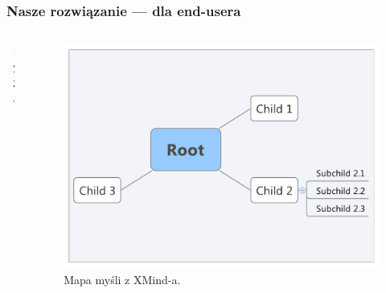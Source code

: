 \begin{frame}
\frametitle{Nasze rozwiązanie --- dla end-usera}

\begin{columns}[c]
	\begin{column}{.45\textwidth}
		\begin{enumerate}
\item {}

\item {}

\item {}

\item {}
		\end{enumerate}
	\end{column}
	\begin{column}{.45\textwidth}
		\begin{figure}
			\includegraphics[width=\textwidth]{xmind}
			\caption{Mapa myśli z XMind-a.}
		\end{figure}
	\end{column}
\end{columns}



\end{frame}
